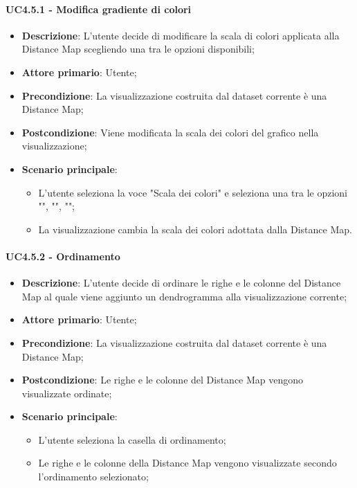 \paragraph{UC4.5.1 - Modifica gradiente di colori}
\label{par:uc4.5.1}
\begin{itemize}
    \item \textbf{Descrizione}: L'utente decide di modificare la scala di colori applicata alla Distance Map scegliendo una tra le opzioni disponibili;
    \item \textbf{Attore primario}: Utente;
    \item \textbf{Precondizione}: La visualizzazione costruita dal dataset corrente è una Distance Map;
    \item \textbf{Postcondizione}: Viene modificata la scala dei colori del grafico nella visualizzazione;
    \item \textbf{Scenario principale}:
    \begin{itemize}
        \item L'utente seleziona la voce "Scala dei colori" e seleziona una tra le opzioni  "", "", "";
        \item La visualizzazione cambia la scala dei colori adottata dalla Distance Map.
    \end{itemize}
\end{itemize}

\paragraph{UC4.5.2 - Ordinamento}
\label{par:uc4.5.2}
\begin{itemize}
    \item \textbf{Descrizione}: L'utente decide di ordinare le righe e le colonne del Distance Map al quale viene aggiunto un dendrogramma alla visualizzazione corrente;
    \item \textbf{Attore primario}: Utente;
    \item \textbf{Precondizione}: La visualizzazione costruita dal dataset corrente è una Distance Map;
    \item \textbf{Postcondizione}: Le righe e le colonne del Distance Map vengono visualizzate ordinate;
    \item \textbf{Scenario principale}:
    \begin{itemize}
        \item L'utente seleziona la casella di ordinamento;
        \item Le righe e le colonne della Distance Map vengono visualizzate secondo l'ordinamento selezionato;
    \end{itemize}
\end{itemize}

